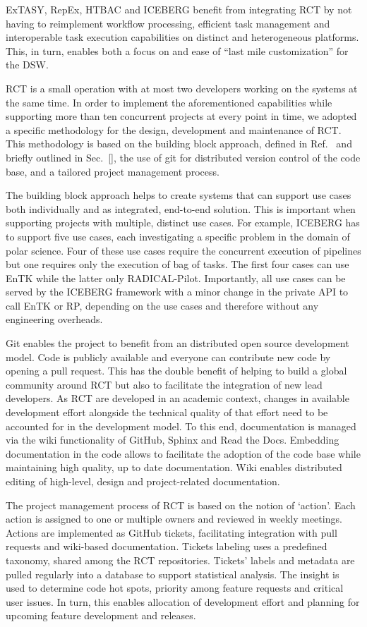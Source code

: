 \documentclass[preprint,12pt, a4paper]{elsarticle}
\begin{document}
ExTASY, RepEx, HTBAC and ICEBERG benefit from integrating RCT by not
having to reimplement workflow processing, efficient task management and
interoperable task execution capabilities on distinct and heterogeneous
platforms. This, in turn, enables both a focus on and ease of ``last mile
customization'' for the DSW\@.

RCT is a small operation with at most two developers working on the systems
at the same time. In order to implement the aforementioned capabilities while
supporting more than ten concurrent projects at every point in time, we
adopted a specific methodology for the design, development and maintenance of
RCT. This methodology is based on the building block approach, defined in
Ref.~\cite{bb} and briefly outlined in Sec.~\ref{}, the use of git for
distributed version control of the code base, and a tailored project
management process.

The building block approach helps to create systems that can support use
cases both individually and as integrated, end-to-end solution. This is
important when supporting projects with multiple, distinct use cases. For
example, ICEBERG has to support five use cases, each investigating a specific
problem in the domain of polar science. Four of these use cases require the
concurrent execution of pipelines but one requires only the execution of bag
of tasks. The first four cases can use EnTK while the latter only
RADICAL-Pilot. Importantly, all use cases can be served by the ICEBERG
framework with a minor change in the private API to call EnTK or RP,
depending on the use cases and therefore without any engineering overheads.

Git enables the project to benefit from an distributed open source
development model. Code is publicly available and everyone can contribute new
code by opening a pull request. This has the double benefit of helping to
build a global community around RCT but also to facilitate the integration of
new lead developers. As RCT are developed in an academic context, changes in
available development effort alongside the technical quality of that effort
need to be accounted for in the development model. To this end, documentation
is managed via the wiki functionality of GitHub, Sphinx and Read the Docs.
Embedding documentation in the code allows to facilitate the adoption of the
code base while maintaining high quality, up to date documentation. Wiki
enables distributed editing of high-level, design and project-related
documentation.

The project management process of RCT is based on the notion of `action'.
Each action is assigned to one or multiple owners and reviewed in weekly
meetings. Actions are implemented as GitHub tickets, facilitating integration
with pull requests and wiki-based documentation. Tickets labeling uses a
predefined taxonomy, shared among the RCT repositories. Tickets' labels and
metadata are pulled regularly into a database to support statistical
analysis. The insight is used to determine code hot spots, priority among
feature requests and critical user issues. In turn, this enables allocation
of development effort and planning for upcoming feature development and
releases.
\end{document}
